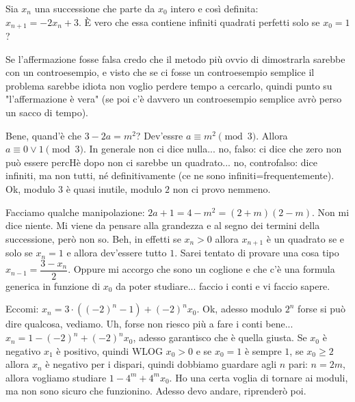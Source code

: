 \begin{prob}
  Sia $x_n$ una successione che parte da $x_0$ intero e così definita: \\ $x_{n+1}=-2x_n+3$. È vero che essa contiene infiniti quadrati perfetti solo se $x_0=1$?
\end{prob}

\begin{sol}
  Se l'affermazione fosse falsa credo che il metodo più ovvio di dimostrarla sarebbe con un controesempio, e visto che se ci fosse un controesempio semplice il problema sarebbe idiota non voglio perdere tempo a cercarlo, quindi punto su "l'affermazione è vera" (se poi c'è davvero un controesempio semplice avrò perso un sacco di tempo).

  Bene, quand'è che $3-2a=m^2$? Dev'essre $a \equiv m^2 \pmod{3}$. Allora $a \equiv 0 \lor 1 \pmod{3}$. In generale non ci dice nulla... no, falso: ci dice che zero non può essere percHè dopo non ci sarebbe un quadrato... no, controfalso: dice infiniti, ma non tutti, né definitivamente (ce ne sono infiniti=frequentemente). Ok, modulo $3$ è quasi inutile, modulo $2$ non ci provo nemmeno.

  Facciamo qualche manipolazione: $2a+1=4-m^2=(2+m)(2-m)$. Non mi dice niente. Mi viene da pensare alla grandezza e al segno dei termini della successione, però non so. Beh, in effetti se $x_n>0$ allora $x_{n+1}$ è un quadrato se e solo se $x_n=1$ e allora dev'essere tutto $1$. Sarei tentato di provare una cosa tipo $x_{n-1}=\dfrac{3-x_n}{2}$. Oppure mi accorgo che sono un coglione e che c'è una formula generica in funzione di $x_0$ da poter studiare... faccio i conti e vi faccio sapere.

  Eccomi: $x_n=3\cdot((-2)^n-1)+(-2)^nx_0$. Ok, adesso modulo $2^n$ forse si può dire qualcosa, vediamo. Uh, forse non riesco più a fare i conti bene... $x_n=1-(-2)^n+(-2)^nx_0$, adesso garantisco che è quella giusta. Se $x_0$ è negativo $x_1$ è positivo, quindi WLOG $x_0>0$ e se $x_0=1$ è sempre $1$, se $x_0 \ge 2$ allora $x_n$ è negativo per i dispari, quindi dobbiamo guardare agli $n$ pari: $n=2m$, allora vogliamo studiare $1-4^m+4^mx_0$. Ho una certa voglia di tornare ai moduli, ma non sono sicuro che funzionino. Adesso devo andare, riprenderò poi.
\end{sol}
